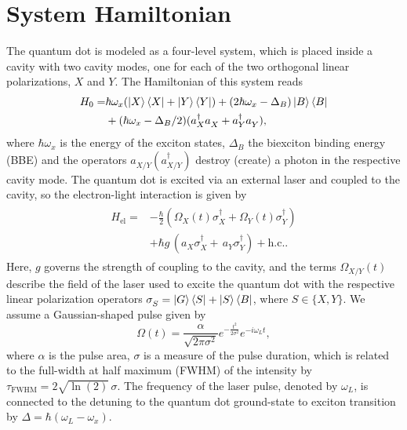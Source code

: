 \documentclass[%
 reprint,superscriptaddress,
 amsmath,amssymb,
 aps]{revtex4-2}
\begin{document}
\section{System Hamiltonian}
The quantum dot is modeled as a four-level system, which is placed inside a cavity with two cavity modes, one for each of the two orthogonal linear polarizations, $X$ and $Y$. The Hamiltonian of this system reads
\begin{align}
\begin{split}
    H_0 = &\hbar\omega_{x}(\ket{X}\bra{X} + \ket{Y}\bra{Y}) + (2\hbar\omega_{x} - \Delta_{B})\ket{B}\bra{B} \\&
    + (\hbar\omega_{x} - \Delta_{B}/2) (a^{\dagger}_X a^{\phantom{\dagger}}_X + a^{\dagger}_Y a^{\phantom{\dagger}}_Y),
\end{split}
\end{align}
where $\hbar\omega_x$ is the energy of the exciton states, $\Delta_B$ the biexciton binding energy (BBE) and the operators $a^{\phantom{\dagger}}_{X/Y} (a^{\dagger}_{X/Y})$ destroy (create) a photon in the respective cavity mode.
The quantum dot is excited via an external laser and coupled to the cavity, so the electron-light interaction is given by 
\begin{align}
\begin{split}
    H_{\text{el}} = &-\frac{\hbar}{2}(\Omega_X(t)\sigma^\dagger_X + \Omega_Y(t)\sigma^\dagger_Y)\\
    & + \hbar g \, (a_X\sigma^\dagger_X  +  \, a_Y\sigma^\dagger_Y) + \text{h.c.}.
\end{split}
\end{align}
Here, $g$ governs the strength of coupling to the cavity, and the terms $\Omega_{X/Y}(t)$ describe the field of the laser used to excite the quantum dot with the respective linear polarization operators $\sigma^{\phantom{\dagger}}_{S} = \ket{G}\bra{S} + \ket{S}\bra{B}$, where $S\in\{X,Y\}$. We assume a Gaussian-shaped pulse given by
\begin{equation}
    \Omega(t) = \frac{\alpha}{\sqrt{2\pi\sigma^2}}e^{-\frac{t^2}{2\sigma
^2}}e^{-i\omega_L t},
\end{equation}
where $\alpha$ is the pulse area, $\sigma$ is a measure of the pulse duration, which is related to the full-width at half maximum (FWHM) of the intensity by $\tau_{\text{FWHM}} = 2\sqrt{\ln(2)}\,\sigma$. The frequency of the laser pulse, denoted by $\omega_L$, is connected to the detuning to the quantum dot ground-state to exciton transition by $\Delta = \hbar(\omega_L - \omega_x)$.\\
\end{document}
